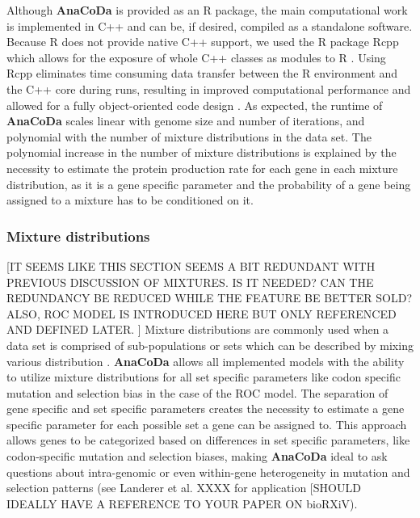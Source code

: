 \documentclass{bioinfo}
\newcommand{\package}{\textbf{AnaCoDa }} %
\begin{document}
Although \package is provided as an R package, the main computational work is implemented in C++ and can be, if desired, compiled as a standalone software.
Because R does not provide native C++ support, we used the R package Rcpp which allows for the exposure of whole C++ classes as modules to R \citep{rcpp_package}.
Using Rcpp eliminates time consuming data transfer between the R environment and the C++ core during runs, resulting in improved computational performance and allowed for a fully object-oriented code design \cite{ood_book}. 
As expected, the runtime of \package scales linear with genome size and number of iterations, and polynomial with the number of mixture distributions in the data set. The polynomial increase in the number of mixture distributions is explained by the necessity to estimate the protein production rate for each gene in each mixture distribution, as it is a gene specific parameter and the probability of a gene being assigned to a mixture has to be conditioned on it.



\subsubsection*{Mixture distributions}
[IT SEEMS LIKE THIS SECTION SEEMS A BIT REDUNDANT WITH PREVIOUS DISCUSSION OF MIXTURES.
IS IT NEEDED?  
CAN THE REDUNDANCY BE REDUCED WHILE THE FEATURE BE BETTER SOLD?
ALSO, ROC MODEL IS INTRODUCED HERE BUT ONLY REFERENCED AND DEFINED LATER.
]
Mixture distributions are commonly used when a data set is comprised of sub-populations or sets which can be described by mixing various distribution \citep{gelman2013}. 
\package allows all implemented models with the ability to utilize mixture distributions for all set specific parameters like codon specific mutation and selection bias in the case of the ROC model. 
The separation of gene specific and set specific parameters creates the necessity to estimate a gene specific parameter for each possible set a gene can be assigned to. 
This approach allows genes to be categorized based on differences in set specific parameters, like codon-specific mutation and selection biases, making \package ideal to ask questions about intra-genomic or even within-gene heterogeneity in mutation and selection patterns (see Landerer et al. XXXX for application [SHOULD IDEALLY HAVE A REFERENCE TO YOUR PAPER ON bioRXiV). 
\end{document}
